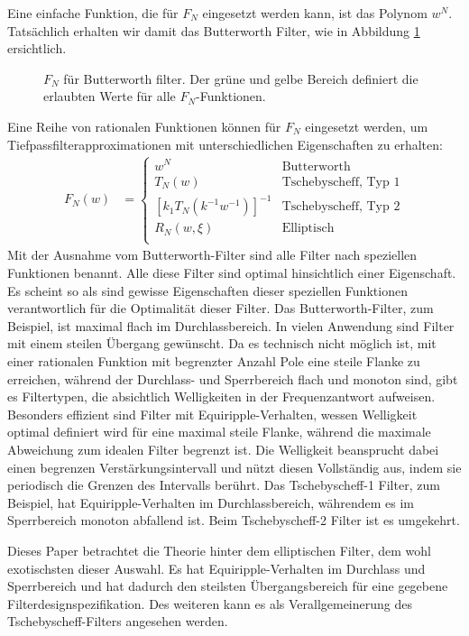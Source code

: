 Eine einfache Funktion, die für $F_N$ eingesetzt werden kann, ist das Polynom $w^N$.
Tatsächlich erhalten wir damit das Butterworth Filter, wie in Abbildung \ref{ellfilter:fig:butterworth} ersichtlich.
\begin{figure}
    \centering
    
    \caption{$F_N$ für Butterworth filter. Der grüne und gelbe Bereich definiert die erlaubten Werte für alle $F_N$-Funktionen.}
    \label{ellfilter:fig:butterworth}
\end{figure}
Eine Reihe von rationalen Funktionen können für $F_N$ eingesetzt werden, um Tiefpassfilter\-approximationen mit unterschiedlichen Eigenschaften zu erhalten:
\begin{align}
    F_N(w) & =
    \begin{cases}
        w^N                            & \text{Butterworth} \\
        T_N(w)                         & \text{Tschebyscheff, Typ 1}  \\
        [k_1 T_N (k^{-1} w^{-1})]^{-1} & \text{Tschebyscheff, Typ 2}  \\
        R_N(w, \xi)                    & \text{Elliptisch}    \\
    \end{cases}
\end{align}
Mit der Ausnahme vom Butterworth-Filter sind alle Filter nach speziellen Funktionen benannt.
Alle diese Filter sind optimal hinsichtlich einer Eigenschaft.
Es scheint so als sind gewisse Eigenschaften dieser speziellen Funktionen verantwortlich für die Optimalität dieser Filter.
Das Butterworth-Filter, zum Beispiel, ist maximal flach im Durchlassbereich.
In vielen Anwendung sind Filter mit einem steilen Übergang gewünscht.
Da es technisch nicht möglich ist, mit einer rationalen Funktion mit begrenzter Anzahl Pole eine steile Flanke zu erreichen, während der Durchlass- und Sperrbereich flach und monoton sind, gibt es Filtertypen, die absichtlich Welligkeiten in der Frequenzantwort aufweisen.
Besonders effizient sind Filter mit Equiripple-Verhalten, wessen Welligkeit optimal definiert wird für eine maximal steile Flanke, während die maximale Abweichung zum idealen Filter begrenzt ist.
Die Welligkeit beansprucht dabei einen begrenzen Verstärkungsintervall und nützt diesen Vollständig aus, indem sie periodisch die Grenzen des Intervalls berührt.
Das Tschebyscheff-1 Filter, zum Beispiel, hat Equiripple-Verhalten im Durchlassbereich, währendem es im Sperrbereich monoton abfallend ist.
Beim Tschebyscheff-2 Filter ist es umgekehrt.

Dieses Paper betrachtet die Theorie hinter dem elliptischen Filter, dem wohl exotischsten dieser Auswahl.
Es hat Equiripple-Verhalten im Durchlass und Sperrbereich und hat dadurch den steilsten Übergangsbereich für eine gegebene Filterdesignspezifikation.
Des weiteren kann es als Verallgemeinerung des Tschebyscheff-Filters angesehen werden.
